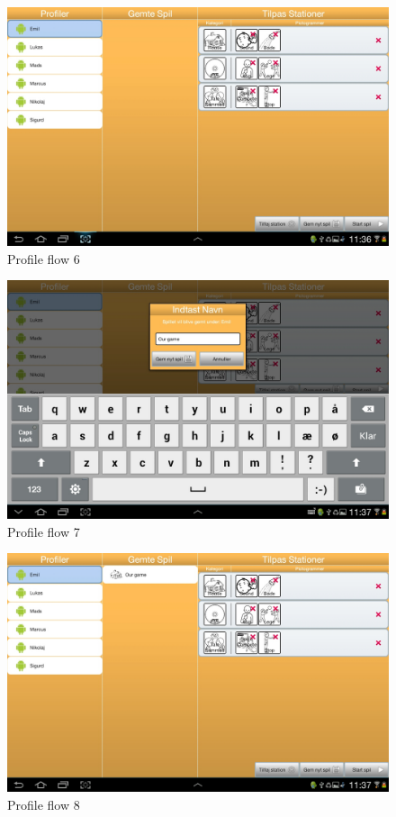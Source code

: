 \begin{figure}[H]
\centering
\includegraphics[width=0.9\linewidth]{img/screenshots/profile_flow_6.jpg}%
\caption{Profile flow 6}
\label{fig:profile_flow_6}
\end{figure}

\begin{figure}[H]
\centering
\includegraphics[width=0.9\linewidth]{img/screenshots/profile_flow_7.jpg}%
\caption{Profile flow 7}
\label{fig:profile_flow_7}
\end{figure}

\begin{figure}[H]
\centering
\includegraphics[width=0.9\linewidth]{img/screenshots/profile_flow_8.jpg}%
\caption{Profile flow 8}
\label{fig:profile_flow_8}
\end{figure}